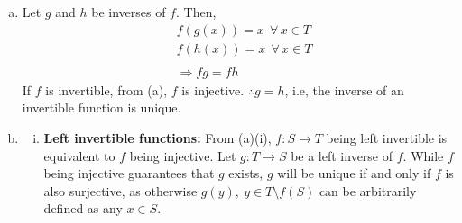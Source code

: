 \documentclass[12pt]{article}
\begin{document}
\begin{enumerate}[(a)]
\begin{enumerate}[(i)]
\begin{proof}
                        \end{proof}
                  \item $\neg P \Longrightarrow \neg Q$
                        \begin{proof}
                              \begin{align*}
                                    \neg P & \Longleftrightarrow \nexists \, g: T \rightarrow S \ \text{with} \ fg = id_T \text{ and } gf = id_S            \\
                                           & \Longleftrightarrow \forall \, g: T \rightarrow S \ fg \ne id_T \text{ or } gf \ne id_S                        \\
                                           & \Longleftrightarrow (\exists \, y \in T \ \text{with}\ y \notin f(S)) \text{ or }                              \\
                                           & \quad \quad \, \, \,(\exists \ x_1, x_2  \in S, \ x_1 \ne x_2, \ \text{with} \ f(x_1) = f(x_2) = y, \ y \in T) \\
                                           & \Longleftrightarrow (f \ \text{is not surjective}) \text{ or } (f \ \text{is not injective})                   \\
                                           & \Longleftrightarrow \neg Q
                              \end{align*}
                        \end{proof}
            \end{enumerate}
      \item
            Let $g$ and $h$ be inverses of $f$. Then,
            \begin{align*}
                   & f(g(x)) = x \ \ \forall \, x \in T \\
                   & f(h(x)) = x \ \ \forall \, x \in T \\ \\
                   & \Longrightarrow fg = fh
            \end{align*}
            If $f$ is invertible, from (a), $f$ is injective. $\therefore g = h$, i.e,
            the inverse of an invertible function is unique.
      \item

            \begin{enumerate}[(i)]
                  \item {\bf Left invertible functions:}
                        From (a)(i), $f: S \rightarrow T$ being left invertible is equivalent to $f$ being injective.
                        Let $g:T\rightarrow S$
                        be a left inverse of $f$.
                        While $f$ being injective guarantees that $g$ exists, $g$ will be unique if and only if $f$ is also surjective, as otherwise
                        $g(y),\ y \in T\setminus f(S)$ can be arbitrarily defined as any $x \in S$.



\end{enumerate}
\end{enumerate}
\end{document}
